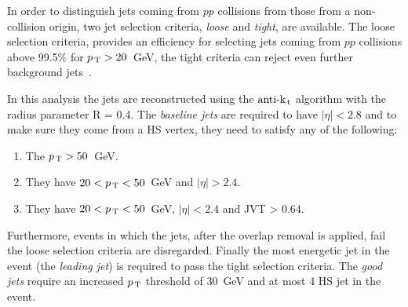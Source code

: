 In order to distinguish jets coming from $pp$ collisions from those from a
non-collision origin, two jet selection criteria, \emph{loose} and \emph{tight},
are available. The loose selection criteria, provides an efficiency for
selecting jets coming from $pp$ collisions above 99.5\% for $p_\mathrm{\, T} > 20$~GeV, the
tight criteria can reject even further background jets~\cite{JetEff}.

In this analysis the jets are reconstructed using the $\text{anti-k}_\mathrm{\, t}$ algorithm with
the radius parameter R = 0.4. The \emph{baseline jets} are required to have
$|\eta| < 2.8$ and to make sure they come from a HS vertex, they need to satisfy
any of the following:
\begin{enumerate}[A -]
  \item The $p_\mathrm{\, T} > 50$~GeV.
  \item They have $20 < p_\mathrm{\, T} < 50$~GeV and $|\eta| > 2.4$.
  \item They have $20 < p_\mathrm{\, T} < 50$~GeV, $|\eta| < 2.4$ and JVT > 0.64.
\end{enumerate}
Furthermore, events in which the jets, after the overlap removal is applied,
fail the loose selection criteria are disregarded. Finally the most energetic
jet in the event (the \emph{leading jet}) is required to pass the tight
selection criteria. The \emph{good jets} require an increased $p_\mathrm{\, T}$ threshold of
30~GeV and at most 4 HS jet in the event.


